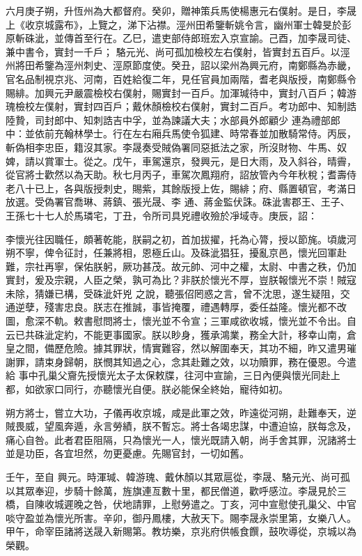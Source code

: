 \begin{pinyinscope}
 六月庚子朔，升恆州為大都督府。癸卯，贈神策兵馬使楊惠元右僕射。是日，李晟上《收京城露布》，上覽之，涕下沾襟。涇州田希鑒斬姚令言，幽州軍士韓旻於彭原斬硃泚，並傳首至行在。乙巳，遣吏部侍郎班宏入京宣諭。己酉，加李晟司徒、兼中書令，實封一千戶；
 駱元光、尚可孤加檢校左右僕射，皆實封五百戶。以涇州將田希鑒為涇州刺史、涇原節度使。癸丑，詔以梁州為興元府，南鄭縣為赤畿，官名品制視京兆、河南，百姓給復二年，見任官員加兩階，耆老與版授，南鄭縣令賜緋。加興元尹嚴震檢校右僕射，賜實封一百戶。加渾瑊待中，實封八百戶；韓游瑰檢校左僕射，實封四百戶；戴休顏檢校右僕射，實封二百戶。考功郎中、知制誥陸贄，司封郎中、知刺誥吉中孚，並為諫議大夫；水部員外郎顧少
 連為禮部郎中：並依前充翰林學士。行在左右廂兵馬使令狐建、時常春並加散騎常侍。丙辰，斬偽相李忠臣，籍沒其家。李晟奏受賊偽署同惡抵法之家，所沒財物、牛馬、奴婢，請以賞軍士。從之。戊午，車駕還京，發興元，是日大雨，及入斜谷，晴霽，從官將士歡然以為天助。秋七月丙子，車駕次鳳翔府，詔放管內今年秋稅；耆壽侍老八十已上，各與版授刺史，賜紫，其餘版授上佐，賜緋；府、縣置頓官，考滿日放選。受偽署官喬琳、蔣鎮、張光晟、李
 通、蔣金監伏誅。硃泚害郡王、王子、王孫七十七人於馬璘宅，丁丑，令所司具兇禮收殮於凈域寺。庚辰，詔：



 李懷光往因職任，頗著乾能，朕嗣之初，首加拔擢，托為心膂，授以節旄。頃歲河朔不寧，俾令征討，任兼將相，恩極丘山。及硃泚猖狂，擾亂京邑，懷光回軍赴難，宗社再寧，保佑朕躬，厥功甚茂。故元帥、河中之權，太尉、中書之秩，仍加實封，爰及宗親，人臣之榮，孰可為比？非朕於懷光不厚，豈朕報懷光不崇！賊寇未除，猜嫌已構，受硃泚奸兇
 之說，聽張佋罔惑之言，曾不沈思，遂生疑阻，交通逆孽，殘害忠良。朕志在推誠，事皆掩覆，禮遇轉厚，委任益隆。懷光都不改圖，愈深不軌。敕書慰問將士，懷光並不令宣；三軍咸欲收城，懷光並不令出。自云已共硃泚定約，不能更事國家。朕以眇身，獲承鴻業，務全大計，移幸山南，倉皇之間，備歷危險。據其罪狀，情實難容，然以解圍奉天，其功不細，昨又遣男璀謝罪，請束身歸朝，朕憫其知過之心，念其赴難之效，以功贖罪，務在優恩。今遣給
 事中孔巢父齎先授懷光太子太保敕牒，往河中宣諭，三日內便與懷光同赴上都，如欲家口同行，亦聽懷光自便。朕必能保全終始，寵待如初。



 朔方將士，嘗立大功，子儀再收京城，咸是此軍之效，昨遠從河朔，赴難奉天，逆賊畏威，望風奔遁，永言勞績，朕不暫忘。將士各竭忠謀，中遭迫協，朕每念及，痛心自咎。此者君臣阻隔，只為懷光一人，懷光既請入朝，尚手舍其罪，況諸將士並是功臣，各宜坦然，勿更憂慮。先賜官封，一切如舊。



 壬午，至自
 興元。時渾瑊、韓游瑰、戴休顏以其眾扈從，李晟、駱元光、尚可孤以其眾奉迎，步騎十餘萬，旌旗連亙數十里，都民僧道，歡呼感泣。李晟見於三橋，自陳收城遲晚之咎，伏地請罪，上慰勞遣之。丁亥，河中宣慰使孔巢父、中官啖守盈並為懷光所害。辛卯，御丹鳳樓，大赦天下。賜李晟永崇里第，女樂八人。甲午，命宰臣諸將送晟入新賜第。教坊樂，京兆府供帳食饌，鼓吹導從，京城以為榮觀。




\end{pinyinscope}
